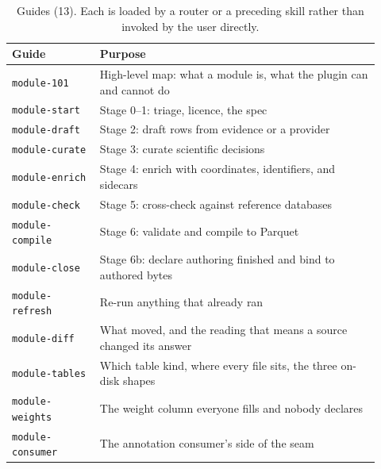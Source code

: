 \documentclass[11pt,a4paper]{article}
\begin{document}
\begin{table}[ht]
\centering
\scriptsize
\caption{Guides (13). Each is loaded by a router or a preceding skill
rather than invoked by the user directly.}
\label{tab:skills-guides}
\begin{tabular}{@{}p{0.22\linewidth}p{0.70\linewidth}@{}}
\toprule
Guide & Purpose \\
\midrule
\texttt{module-101}      & High-level map: what a module is, what the plugin can and cannot do \\
\texttt{module-start}    & Stage 0--1: triage, licence, the spec \\
\texttt{module-draft}    & Stage 2: draft rows from evidence or a provider \\
\texttt{module-curate}   & Stage 3: curate scientific decisions \\
\texttt{module-enrich}   & Stage 4: enrich with coordinates, identifiers, and sidecars \\
\texttt{module-check}    & Stage 5: cross-check against reference databases \\
\texttt{module-compile}  & Stage 6: validate and compile to Parquet \\
\texttt{module-close}    & Stage 6b: declare authoring finished and bind to authored bytes \\
\texttt{module-refresh}  & Re-run anything that already ran \\
\texttt{module-diff}     & What moved, and the reading that means a source changed its answer \\
\texttt{module-tables}   & Which table kind, where every file sits, the three on-disk shapes \\
\texttt{module-weights}  & The weight column everyone fills and nobody declares \\
\texttt{module-consumer} & The annotation consumer's side of the seam \\
\bottomrule
\end{tabular}
\end{table}
\end{document}
